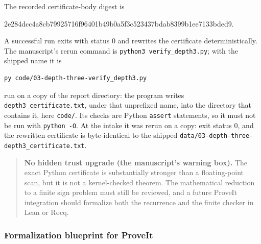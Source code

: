 \documentclass[11pt,a4paper]{article}
\numberwithin{equation}{section}
\theoremstyle{definition}
\theoremstyle{remark}
\theoremstyle{plain}
\begin{document}
The recorded certificate-body digest is
\begin{center}
\small\ttfamily
2e284dcc4a8cb79925716f96401b49b0\allowbreak a5f3c523437bdab8399b1ee7133bded9.
\end{center}
A successful run exits with status $0$ and rewrites the certificate
deterministically.  The manuscript's rerun command is
\texttt{python3 verify\_depth3.py}; with the shipped name it is
\begin{lstlisting}
py code/03-depth-three-verify_depth3.py
\end{lstlisting}
run on a copy of the report directory: the program writes
\texttt{depth3\_\allowbreak certificate.txt}, under that unprefixed name, into the
directory that contains it, here \texttt{code/}.  Its checks are Python
\texttt{assert} statements, so it must not be run with \texttt{python -O}.
At the intake it was rerun on a copy: exit status $0$, and the rewritten
certificate is byte-identical to the shipped
\texttt{data/03-depth-\allowbreak three-\allowbreak depth3\_certificate.txt}.

\begin{quote}\small
\textbf{No hidden trust upgrade (the manuscript's warning box).}
The exact Python certificate is substantially stronger than a floating-point
scan, but it is not a kernel-checked theorem.  The mathematical reduction to a
finite sign problem must still be reviewed, and a future ProveIt integration
should formalize both the recurrence and the finite checker in Lean or Rocq.
\end{quote}

\subsubsection{Formalization blueprint for ProveIt}\label{xxb:d3:sec:formalization}
\end{document}
